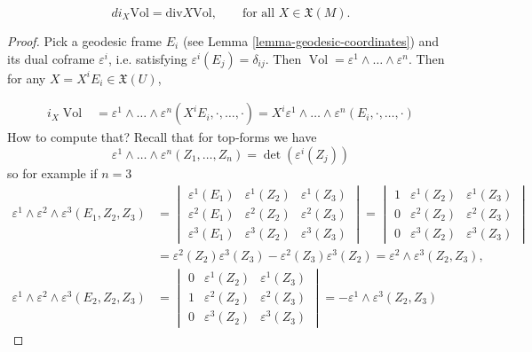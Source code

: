 \begin{lemma}
\label{lemma-divergence-and-volume}
\begin{equation}
\label{equation-divergence-and-volume}
di_X\text{Vol}=\text{div}X\text{Vol},\qquad \text{for all }X\in \mathfrak{X}(M).
\end{equation}
\end{lemma}

\begin{proof}
Pick a geodesic frame $E_i$ (see Lemma \ref{lemma-geodesic-coordinates}) and
its dual coframe $\varepsilon^i$, i.e. satisfying
$\varepsilon^i(E_j)=\delta_{ij}$. Then $\operatorname{Vol}=\varepsilon^1
\wedge \ldots \wedge \varepsilon^n$. Then for any $X=X^iE_i \in
\mathfrak{X}(U)$,

\begin{align*}
i_X\operatorname{Vol}
&=\varepsilon^1\wedge\ldots\wedge\varepsilon^n(X^iE_i,\cdot,\ldots,\cdot)
=X^i\varepsilon^1\wedge\ldots\wedge\varepsilon^n(E_i,\cdot,\ldots,\cdot)
\end{align*}
How to compute that? Recall that for top-forms we have
$$
\varepsilon^1\wedge\ldots\wedge\varepsilon^n(Z_1,\ldots,Z_n)
=\det(\varepsilon^i(Z_j))
$$
so for example if $n=3$
\begin{align*}\varepsilon^1\wedge \varepsilon^2\wedge\varepsilon^3(E_1,Z_2,Z_3)
&=\begin{vmatrix}
\varepsilon^1(E_1)&\varepsilon^1(Z_2) &\varepsilon^1(Z_3)\\
\varepsilon^2(E_1)&\varepsilon^2(Z_2)&\varepsilon^2(Z_3)\\
\varepsilon^3(E_1)&\varepsilon^3(Z_2)&\varepsilon^3(Z_3)
\end{vmatrix}
=\begin{vmatrix}
1&\varepsilon^1(Z_2) &\varepsilon^1(Z_3)\\
0&\varepsilon^2(Z_2)&\varepsilon^2(Z_3)\\
0&\varepsilon^3(Z_2)&\varepsilon^3(Z_3)
\end{vmatrix}\\
&=\varepsilon^2(Z_2)\varepsilon^3(Z_3)-\varepsilon^2(Z_3)\varepsilon^3(Z_2)
=\varepsilon^2\wedge\varepsilon^3(Z_2,Z_3),\\
\varepsilon^1\wedge\varepsilon^2\wedge\varepsilon^3(E_2,Z_2,Z_3)
&=\begin{vmatrix}
0&\varepsilon^1(Z_2) &\varepsilon^1(Z_3)\\
1&\varepsilon^2(Z_2)&\varepsilon^2(Z_3)\\
0&\varepsilon^3(Z_2)&\varepsilon^3(Z_3)
\end{vmatrix}=-\varepsilon^1\wedge\varepsilon^3(Z_2,Z_3)

\end{align*}
\end{proof}
